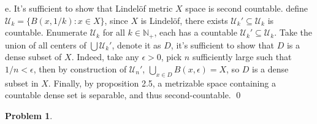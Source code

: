 \documentclass[12pt]{article}
\newtheorem{problem}{Problem}
\begin{document}
\indent e. It's sufficient to show that Lindelöf metric $X$ space is second countable. define $\mathcal{U}_{k}=\{B(x,1/k): x\in X\}$, since $X$ is Lindelöf, there exists $\mathcal{U}_{k}'\subseteq\mathcal{U}_{k}$ is countable. Enumerate $\mathcal{U}_{k}$ for all $k\in\mathbb{N}_{+}$, each has a countable $\mathcal{U}_{k}'\subseteq\mathcal{U}_{k}$. Take the union of all centers of $\bigcup \mathcal{U}_{k}'$, denote it as $D$, it's sufficient to show that $D$ is a dense subset of $X$. Indeed, take any $\epsilon>0$, pick $n$ sufficiently large such that $1/n < \epsilon$, then by construction of $\mathcal{U}_{n}'$, $\bigcup_{x\in D}B(x,\epsilon)=X$, so $D$ is a dense subset in $X$. Finally, by proposition 2.5, a metrizable space containing a countable dense set is separable, and thus second-countable. \qed
\\
\begin{problem}

\end{problem}
\end{document}

